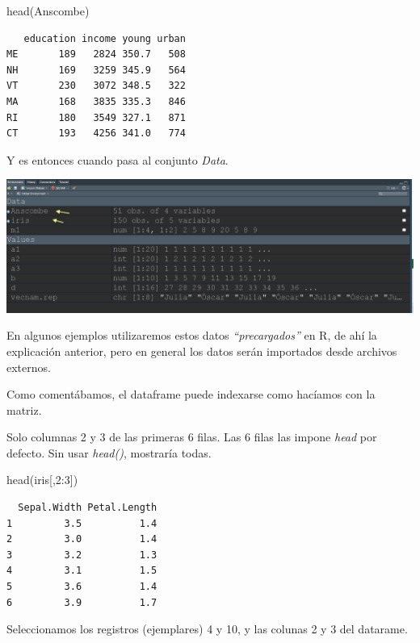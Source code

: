 \documentclass[
  letterpaper,
  DIV=11,
  numbers=noendperiod]{scrreprt}
\newenvironment{Shaded}{\begin{snugshade}}{\end{snugshade}}
\newcommand{\DecValTok}[1]{\textcolor[rgb]{0.68,0.00,0.00}{#1}}
\newcommand{\FunctionTok}[1]{\textcolor[rgb]{0.28,0.35,0.67}{#1}}
\newcommand{\NormalTok}[1]{\textcolor[rgb]{0.00,0.23,0.31}{#1}}
\newcommand{\SpecialCharTok}[1]{\textcolor[rgb]{0.37,0.37,0.37}{#1}}
\begin{document}
\begin{Shaded}
\begin{Highlighting}[]
\FunctionTok{head}\NormalTok{(Anscombe) }
\end{Highlighting}
\end{Shaded}

\begin{verbatim}
   education income young urban
ME       189   2824 350.7   508
NH       169   3259 345.9   564
VT       230   3072 348.5   322
MA       168   3835 335.3   846
RI       180   3549 327.1   871
CT       193   4256 341.0   774
\end{verbatim}

Y es entonces cuando pasa al conjunto \emph{Data}.

\includegraphics{./pics/Promise2.png}

En algunos ejemplos utilizaremos estos datos \emph{``precargados''} en
R, de ahí la explicación anterior, pero en general los datos serán
importados desde archivos externos.

Como comentábamos, el dataframe puede indexarse como hacíamos con la
matriz.

Solo columnas 2 y 3 de las primeras 6 filas. Las 6 filas las impone
\emph{head} por defecto. Sin usar \emph{head()}, mostraría todas.

\begin{Shaded}
\begin{Highlighting}[]
\FunctionTok{head}\NormalTok{(iris[,}\DecValTok{2}\SpecialCharTok{:}\DecValTok{3}\NormalTok{])}
\end{Highlighting}
\end{Shaded}

\begin{verbatim}
  Sepal.Width Petal.Length
1         3.5          1.4
2         3.0          1.4
3         3.2          1.3
4         3.1          1.5
5         3.6          1.4
6         3.9          1.7
\end{verbatim}

Seleccionamos los registros (ejemplares) 4 y 10, y las colunas 2 y 3 del
datarame.
\end{document}
